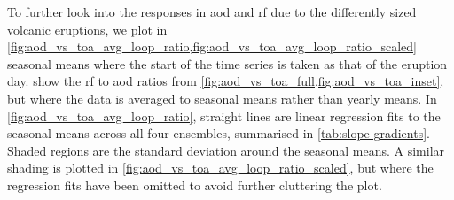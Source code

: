 \documentclass{ametsocV5}
\begin{document}
To further look into the responses in \ac{aod} and \ac{rf} due to the differently sized
volcanic eruptions, we plot in
\cref{fig:aod_vs_toa_avg_loop_ratio,fig:aod_vs_toa_avg_loop_ratio_scaled} seasonal means
where the start of the time series is taken as that of the eruption day.
 show the
\ac{rf} to \ac{aod} ratios from \cref{fig:aod_vs_toa_full,fig:aod_vs_toa_inset}, but
where the data is averaged to seasonal means rather than yearly means. In
\cref{fig:aod_vs_toa_avg_loop_ratio}, straight lines are linear regression fits to the
seasonal means across all four ensembles, summarised in \cref{tab:slope-gradients}.
Shaded regions are the standard deviation around the seasonal means. A similar shading
is plotted in \cref{fig:aod_vs_toa_avg_loop_ratio_scaled}, but where the regression fits
have been omitted to avoid further cluttering the plot.

\end{document}
